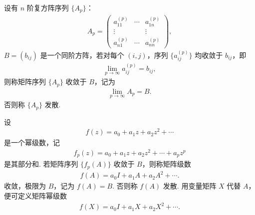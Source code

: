 \documentclass[../../main.tex]{subfiles}
\begin{document}
\begin{definition}[复方阵幂级数]
设有 $n$ 阶复方阵序列 $\{A_p\}$：
\begin{align*}
A_p = \begin{pmatrix}
a_{11}^{(p)} & \cdots & a_{1n}^{(p)} \\
\vdots & & \vdots \\
a_{n1}^{(p)} & \cdots & a_{nn}^{(p)}
\end{pmatrix},
\end{align*}
$B = (b_{ij})$ 是一个同阶方阵，若对每个 $(i,j)$，序列 $\{a_{ij}^{(p)}\}$ 均收敛于 $b_{ij}$，即
\begin{align*}
\lim_{p \to \infty} a_{ij}^{(p)} = b_{ij},
\end{align*}
则称矩阵序列 $\{A_p\}$ 收敛于 $B$，记为
\begin{align*}
\lim_{p \to \infty} A_p = B.
\end{align*}
否则称 $\{A_p\}$ 发散.

设
\begin{align*}
f(z) = a_0 + a_1z + a_2z^2 + \cdots
\end{align*}
是一个幂级数，记
\begin{align*}
f_p(z) = a_0 + a_1z + a_2z^2 + \cdots + a_pz^p
\end{align*}
是其部分和. 若矩阵序列 $\{f_p(A)\}$ 收敛于 $B$，则称矩阵级数
\begin{align*}
f(A) = a_0I + a_1A + a_2A^2 + \cdots .
\end{align*}
收敛，极限为 $B$，记为 $f(A) = B$. 否则称 $f(A)$ 发散. 用变量矩阵 $X$ 代替 $A$，便可定义矩阵幂级数
\begin{align*}
f(X) = a_0I + a_1X + a_2X^2 + \cdots. 
\end{align*} 
\end{definition}
\end{document}
